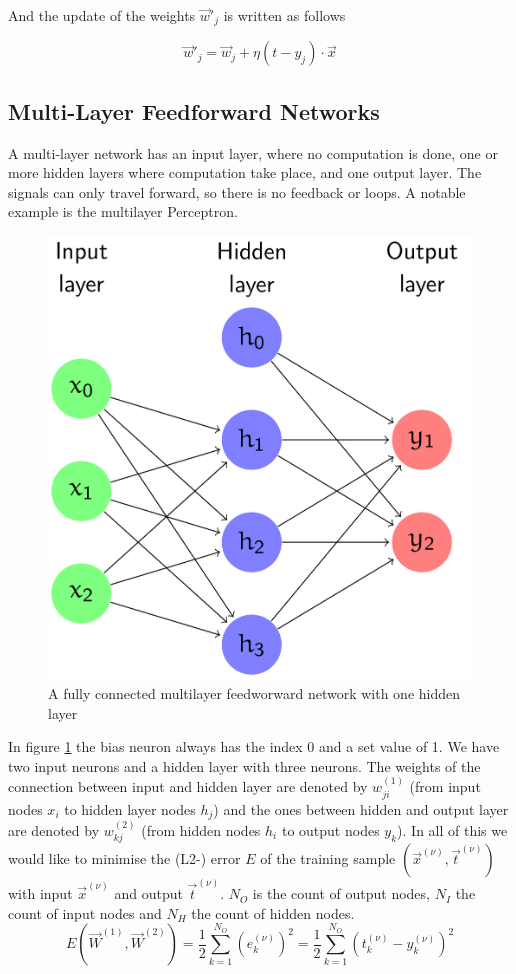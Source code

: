 \documentclass[11pt]{article}
\begin{document}
\noindent
And the update of the weights $\vec{w}'_j$ is written as follows

\begin{equation}
    \vec{w}'_j = \vec{w}_j + \eta (t - y_j)\cdot \vec{x}
\end{equation}

\subsection{Multi-Layer Feedforward Networks}
A multi-layer network has an input layer, where no computation is done, one or more hidden layers where computation take place, and one output layer. The signals can only travel forward, so there is no feedback or loops. A notable example is the multilayer Perceptron.

\begin{figure}[tbh!]
    \centering
    \includegraphics[keepaspectratio, width=0.6\linewidth]{Pictures/fully_connected_multilayer_feedforward_network}
    \caption{A fully connected multilayer feedworward network with one hidden layer}
    \label{fig:fullyconnectedmultilayerfeedforwardnetwork}
\end{figure}

In figure \ref{fig:fullyconnectedmultilayerfeedforwardnetwork} the bias neuron always has the index 0 and a set value of 1. We have two input neurons and a hidden layer with three neurons. The weights of the connection between input and hidden layer are denoted by $w_{ji}^{(1)}$ (from input nodes $x_i$ to hidden layer nodes $h_j$) and the ones between hidden and output layer are denoted by $w_{kj}^{(2)}$ (from hidden nodes $h_i$ to output nodes $y_k$). In all of this we would like to minimise the (L2-) error $E$ of the training sample $(\vec{x}^{(\nu)}, \vec{t}^{(\nu)})$ with input $\vec{x}^{(\nu)}$ and output $ \vec{t}^{(\nu)}$. $N_O$ is the count of output nodes, $N_I$ the count of input nodes and $N_H$ the count of hidden nodes.
\begin{equation}
    E\left(\vec{W}^{(1)}, \vec{W}^{(2)}\right) = \frac{1}{2} \sum_{k=1}^{N_O} \left(e_k^{(\nu)}\right)^2 = \frac{1}{2} \sum_{k=1}^{N_O} \left(t_k^{(\nu)} - y_k^{(\nu)}\right)^2
\end{equation}
\end{document}
